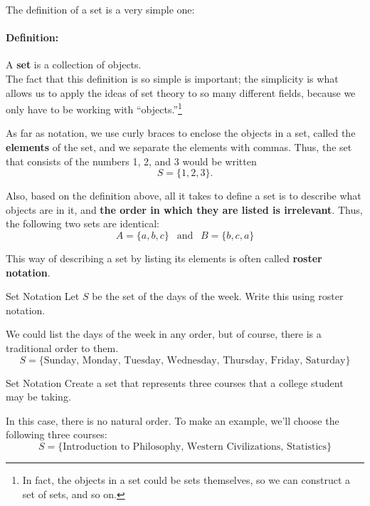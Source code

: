 \setcounter{ExampleCounter}{1}
The definition of a set is a very simple one:
\paragraph{Definition:} A \textbf{set} is a collection of objects.\\

The fact that this definition is so simple is important; the simplicity is what allows us to apply the ideas of set theory to so many different fields, because we only have to be working with ``objects.''\footnote{In fact, the objects in a set could be sets themselves, so we can construct a set of sets, and so on.}

As far as notation, we use curly braces to enclose the objects in a set, called the \textbf{elements} of the set, and we separate the elements with commas.  Thus, the set that consists of the numbers 1, 2, and 3 would be written
\[S = \{1, 2, 3\}.\]

Also, based on the definition above, all it takes to define a set is to describe what objects are in it, and \textbf{the order in which they are listed is irrelevant}.  Thus, the following two sets are identical:
\[A = \{a, b, c\} \ \ \textrm{ and } \ \ B = \{b, c, a\}\]

This way of describing a set by listing its elements is often called \textbf{roster notation}.

\begin{example}[https://www.youtube.com/watch?v=QKKv0mF1wdo&list=PLfmpjsIzhztuvrh-T2Owgo_gO84qypSBG&index=1]{Set Notation}
Let $S$ be the set of the days of the week.  Write this using roster notation.

\sol
We could list the days of the week in any order, but of course, there is a traditional order to them.
\[\boxed{S = \{\textrm{Sunday, Monday, Tuesday, Wednesday, Thursday, Friday, Saturday}}\}\]
\end{example}

\begin{example}[https://www.youtube.com/watch?v=cZkOnM0HnhU&list=PLfmpjsIzhztuvrh-T2Owgo_gO84qypSBG&index=2]{Set Notation}
Create a set that represents three courses that a college student may be taking.

\sol
In this case, there is no natural order.  To make an example, we'll choose the following three courses:
\[\boxed{S = \{\textrm{Introduction to Philosophy, Western Civilizations, Statistics}\}}\]
\end{example}


